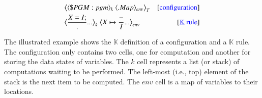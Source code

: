 \documentclass[letterpaper, 10 pt, conference]{IEEEtran}
\begin{document}
\begin{align}
&\big\langle \langle \$PGM:pgm \rangle_k~\langle .Map \rangle_{env} \big\rangle_T &  [{\color{blue}{\text{configuration}}}]\notag\\
&\big\langle\dfrac{X=I; }{.}...\big\rangle_k~ \big\langle X \mapsto  \dfrac{-}{I}...\big\rangle_{env} &  [{\color{blue}{\mathbb{K}~ \text{rule}}}]\notag
\end{align}

\par The illustrated example shows the $\mathbb{K}$ definition of a configuration and a $\mathbb{K}$ rule. The configuration only contains two cells, one for computation and another for storing the data states of variables. The $k$ cell represents a list (or stack) of computations waiting to be performed. The left-most (i.e., top) element of the stack is the next item to be computed. The $env$ cell is a map of variables to their locations.
\end{document}
